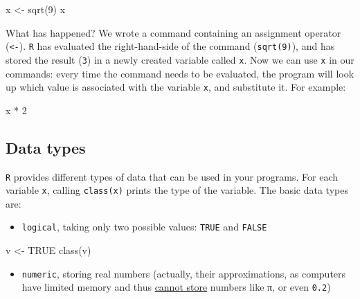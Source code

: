 \documentclass[
  letterpaper,
  DIV=11,
  numbers=noendperiod]{scrreprt}
\newenvironment{Shaded}{\begin{snugshade}}{\end{snugshade}}
\newcommand{\NormalTok}[1]{\textcolor[rgb]{0.00,0.23,0.31}{#1}}
\providecommand{\tightlist}{%
  \setlength{\itemsep}{0pt}\setlength{\parskip}{0pt}}\usepackage{longtable,booktabs,array}
\begin{document}
\begin{Shaded}
\begin{Highlighting}[]
\NormalTok{x \textless{}{-} sqrt(9)}
\NormalTok{x}
\end{Highlighting}
\end{Shaded}

What has happened? We wrote a command containing an assignment operator
(\texttt{\textless{}-}). \texttt{R} has evaluated the right-hand-side of
the command (\texttt{sqrt(9)}), and has stored the result (\texttt{3})
in a newly created variable called \texttt{x}. Now we can use \texttt{x}
in our commands: every time the command needs to be evaluated, the
program will look up which value is associated with the variable
\texttt{x}, and substitute it. For example:

\begin{Shaded}
\begin{Highlighting}[]
\NormalTok{x * 2 }
\end{Highlighting}
\end{Shaded}

\subsection*{Data types}\label{data-types}

\texttt{R} provides different types of data that can be used in your
programs. For each variable \texttt{x}, calling \texttt{class(x)} prints
the type of the variable. The basic data types are:

\begin{itemize}
\tightlist
\item
  \texttt{logical}, taking only two possible values: \texttt{TRUE} and
  \texttt{FALSE}
\end{itemize}

\begin{Shaded}
\begin{Highlighting}[]
\NormalTok{v \textless{}{-} TRUE}
\NormalTok{class(v)}
\end{Highlighting}
\end{Shaded}

\begin{itemize}
\tightlist
\item
  \texttt{numeric}, storing real numbers (actually, their
  approximations, as computers have limited memory and thus
  \href{https://www.exploringbinary.com/why-0-point-1-does-not-exist-in-floating-point/}{cannot
  store} numbers like π, or even \texttt{0.2})
\end{itemize}
\end{document}
